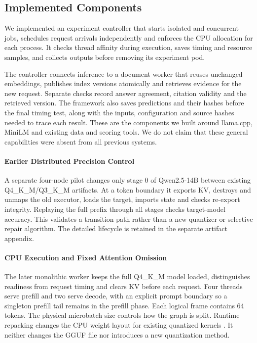 \subsection{Implemented Components}
\label{sec:mechanisms}
We implemented an experiment controller that starts isolated and concurrent
jobs, schedules request arrivals independently and enforces the CPU allocation
for each process. It checks thread affinity during execution, saves timing
and resource samples, and collects outputs before removing its experiment pod.

The controller connects inference to a document worker that reuses unchanged
embeddings, publishes index versions atomically and retrieves evidence for the
new request. Separate checks record answer agreement, citation validity and
the retrieved version. The framework also saves predictions and their hashes
before the final timing test, along with the inputs, configuration and source
hashes needed to trace each result. These are the components we built around
llama.cpp, MiniLM and existing data and scoring tools. We do not claim that
these general capabilities were absent from all previous systems.

\paragraph{Earlier Distributed Precision Control}
A separate four-node pilot changes only stage 0 of Qwen2.5-14B between existing
Q4\_K\_M/Q3\_K\_M artifacts. At a token boundary it exports KV, destroys and
unmaps the old executor, loads the target, imports state and checks re-export
integrity. Replaying the full prefix through all stages checks target-model accuracy. This validates
a transition path rather than a new quantizer or selective repair algorithm.
The detailed lifecycle is retained in the separate artifact appendix.

\paragraph{CPU Execution and Fixed Attention Omission}
The later monolithic worker keeps the full Q4\_K\_M model loaded, distinguishes
readiness from request timing and clears KV before each request. Four threads
serve prefill and two serve decode, with an explicit prompt boundary so a
singleton prefill tail remains in the prefill phase. Each logical frame contains 64 tokens. The physical microbatch size controls
how the graph is split. Runtime repacking
changes the CPU weight layout for existing quantized kernels \citep{llamacpp}.
It neither changes the GGUF file nor introduces a new quantization method.

